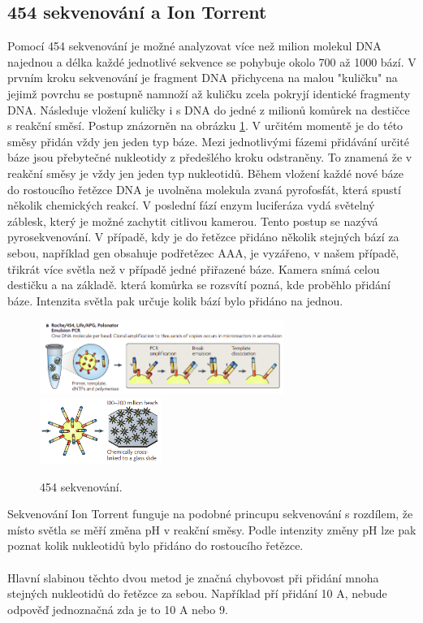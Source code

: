 \documentclass[czech,DP]{thesiskiv}
\numberwithin{equation}{section}
\begin{document}
\subsection{454 sekvenování a Ion Torrent}
Pomocí 454 sekvenování je možné analyzovat více než milion molekul DNA najednou a délka každé jednotlivé sekvence se pohybuje okolo 700 až 1000 bází. V prvním kroku sekvenování je fragment DNA přichycena na malou "kuličku" na jejimž povrchu se postupně namnoží až kuličku zcela pokryjí identické fragmenty DNA. Následuje vložení kuličky i s DNA do jedné z milionů komůrek na destičce s reakční směsí. Postup znázorněn na obrázku \ref{fig:sekvenovani_454}. V určitém momentě je do této směsy přidán vždy jen jeden typ báze. Mezi jednotlivými fázemi přidávání určité báze jsou přebytečné nukleotidy z předešlého kroku odstraněny. To znamená že v reakční směsy je vždy jen jeden typ nukleotidů. Během vložení každé nové báze do rostoucího řetězce DNA je uvolněna molekula zvaná pyrofosfát, která spustí několik chemických reakcí. V poslední fází enzym luciferáza vydá světelný záblesk, který je možné zachytit citlivou kamerou.  Tento postup se nazývá pyrosekvenování. V případě, kdy je do řetězce přidáno několik stejných bází za sebou, například gen obsahuje podřetězec AAA, je vyzářeno, v našem případě, třikrát více světla než v případě jedné přiřazené báze. Kamera snímá celou destičku a na základě. která komůrka se rozsvítí pozná, kde proběhlo přidání báze. Intenzita světla pak určuje kolik bází bylo přidáno na jednou. 


\begin{figure}[H]		
		\centering
		\includegraphics[width=300px]{./img/sekvenace_454_1.png}
		\includegraphics[width=150px]{./img/sekvenace_454_2.png}
		\caption{454 sekvenování. \cite{ngs_merzker}}
		\label{fig:sekvenovani_454}
\end{figure}

\noindent
Sekvenování Ion Torrent funguje na podobné princupu sekvenování s rozdílem, že místo světla se měří změna pH v reakční směsy. Podle intenzity změny pH lze pak poznat kolik nukleotidů bylo přidáno do rostoucího řetězce.
\\
\\
Hlavní slabinou těchto dvou metod je značná chybovost při přidání mnoha stejných nukleotidů do řetězce za sebou. Například pří přidání 10 A, nebude odpověď jednoznačná zda je to 10 A nebo 9.
\end{document}
